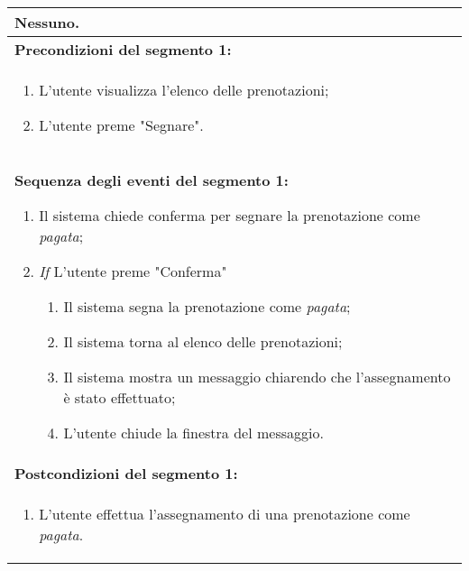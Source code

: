 \documentclass{article}
\begin{document}
\begin{table}[t]
\begin{tabular}{|p{\linewidth}|}
        Nessuno. \\
        \hline
        \cellcolor{gray!20}
        \textbf{Precondizioni del segmento 1:} \\
        \cellcolor{gray!20}
        \begin{minipage}{\linewidth}
            \begin{enumerate}[noitemsep]
                \item L'utente visualizza l'elenco delle prenotazioni;
                \item L'utente preme "Segnare".
            \end{enumerate}
        \end{minipage}
        \vspace{-5pt} \\
        \hline
        \textbf{Sequenza degli eventi del segmento 1:}
        \begin{enumerate}
            \item Il sistema chiede conferma per segnare la prenotazione come \emph{pagata};
            \item \textit{If} L'utente preme "Conferma"
            \begin{enumerate}
                \item Il sistema segna la prenotazione come \emph{pagata};
                \item Il sistema torna al elenco delle prenotazioni;
                \item Il sistema mostra un messaggio chiarendo che l'assegnamento è stato effettuato;
                \item L'utente chiude la finestra del messaggio.
            \end{enumerate}
        \end{enumerate} \\
        \hline
        \cellcolor{gray!20}
        \textbf{Postcondizioni del segmento 1:} \\
        \cellcolor{gray!20}
        \begin{minipage}{\linewidth}
            \begin{enumerate}[noitemsep]
                \item L'utente effettua l'assegnamento di una prenotazione come \emph{pagata}.
            \end{enumerate}
        \end{minipage} \\
        \hline
    \end{tabular}
\end{table}
\end{document}
